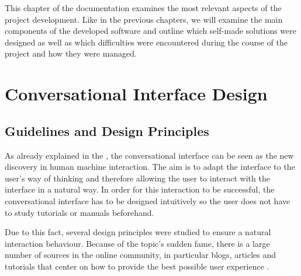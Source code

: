  \label{ch:RA}

This chapter of the documentation examines the most relevant aspects of the project development. Like in the previous chapters, we will examine the main components of the developed software and outline which self-made solutions were designed as well as which difficulties were encountered during the course of the project and how they were managed. 

\section{Conversational Interface Design}
\subsection{Guidelines and Design Principles}
As already explained in the , the conversational interface can be seen as the new discovery in human machine interaction. The aim is to adapt the interface to the user’s way of thinking and therefore allowing the user to interact with the interface in a natural way. In order for this interaction to be successful, the conversational interface has to be designed intuitively so the user does not have to study tutorials or manuals beforehand.

Due to this fact, several design principles were studied to ensure a natural interaction behaviour. Because of the topic’s sudden fame, there is a large number of sources in the online community, in particular blogs, articles and tutorials that center on how to provide the best possible user experience \cite{chatbotmag:bestpractices} \cite{intercom:designprinciples}.

